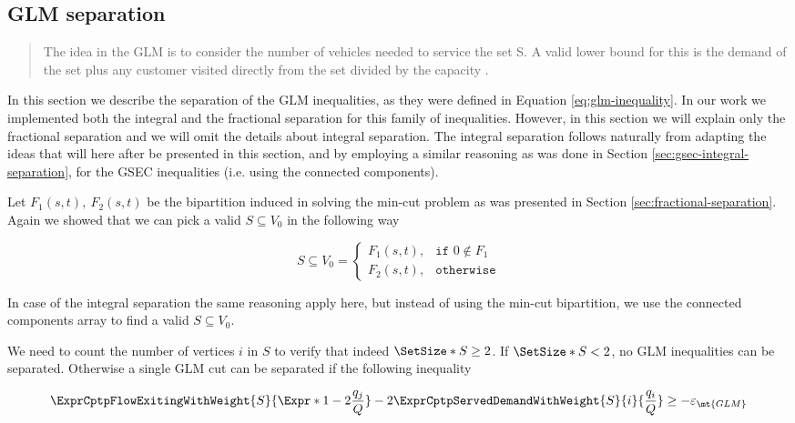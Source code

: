 \subsection{GLM separation}\label{sec:glm-separation}
\begin{quote}
	The idea in the GLM is to consider the number of vehicles needed to service
	the set S. A valid lower bound for this is the demand of the set plus any
	customer visited directly from the set divided by the capacity \cite{jepsen2011}.
\end{quote}


In this section we describe the separation of the GLM inequalities, as they were defined in Equation \eqref{eq:glm-inequality}.
In our work we implemented both the integral and the fractional separation for this family of inequalities.
However, in this section we will explain only the fractional separation and we will omit the details about integral separation.
The integral separation follows naturally from adapting the ideas that will here after be presented in this section, and by employing a similar reasoning as was done in Section \ref{sec:gsec-integral-separation}, for the GSEC inequalities (i.e. using the connected components).

Let $F_1(s, t),\ F_2(s, t)$ be the bipartition induced in solving the min-cut problem as was presented in Section \ref{sec:fractional-separation}.
Again we showed that we can pick a valid $S \subseteq V_0$ in the following way

\begin{equation}
	S \subseteq V_0 =
	\begin{cases}
		F_1(s, t), & \texttt{if } 0 \notin F_1 \\
		F_2(s, t), & \texttt{otherwise}
	\end{cases}
\end{equation}

In case of the integral separation the same reasoning apply here, but instead of using the min-cut bipartition, we use the connected components array to find a valid $S \subseteq V_0$.

We need to count the number of vertices $i$ in $S$ to verify that indeed $\SetSize*{S} \ge 2$.
If $\SetSize*{S} < 2$, no GLM inequalities can be separated.
Otherwise a single GLM cut can be separated if the following inequality

\begin{equation}
	\begin{split}
		\ExprCptpFlowExitingWithWeight{S}{\Expr*{1 - 2 \frac{q_j}{Q}}} - 2 	\ExprCptpServedDemandWithWeight{S}{i}{\frac{q_i}{Q}} \ge - \varepsilon_{\mt{GLM}}
	\end{split}
\end{equation}


